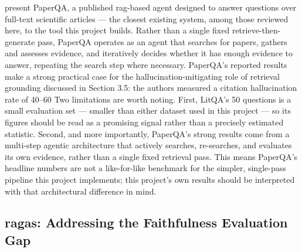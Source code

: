 \citet{lala2023paperqa} present PaperQA, a published \gls{rag}-based agent designed to answer questions over full-text scientific articles — the closest existing system, among those reviewed here, to the tool this project builds. Rather than a single fixed retrieve-then-generate pass, PaperQA operates as an agent that searches for papers, gathers and assesses evidence, and iteratively decides whether it has enough evidence to answer, repeating the search step where necessary.
\newline \newline PaperQA's reported results make a strong practical case for the hallucination-mitigating role of retrieval grounding discussed in Section 3.5: the authors measured a citation hallucination rate of 40–60%
\newline \newline Two limitations are worth noting. First, LitQA's 50 questions is a small evaluation set — smaller than either dataset used in this project — so its figures should be read as a promising signal rather than a precisely estimated statistic. Second, and more importantly, PaperQA's strong results come from a multi-step agentic architecture that actively searches, re-searches, and evaluates its own evidence, rather than a single fixed retrieval pass. This means PaperQA's headline numbers are not a like-for-like benchmark for the simpler, single-pass pipeline this project implements; this project's own results should be interpreted with that architectural difference in mind.

\subsection{\gls{ragas}: Addressing the Faithfulness Evaluation Gap}

